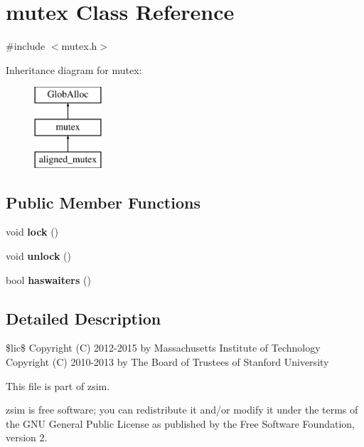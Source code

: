 \hypertarget{classmutex}{\section{mutex Class Reference}
\label{classmutex}
}


{\ttfamily \#include $<$mutex.\-h$>$}

Inheritance diagram for mutex\-:\begin{figure}[H]
\begin{center}
\leavevmode
\includegraphics[height=3.000000cm]{classmutex}
\end{center}
\end{figure}
\subsection*{Public Member Functions}
\begin{DoxyCompactItemize}
\item 
\hypertarget{classmutex_a760ba333c299e9b27730051c4c794f50}{void {\bfseries lock} ()}\label{classmutex_a760ba333c299e9b27730051c4c794f50}

\item 
\hypertarget{classmutex_a362d78bead80c2899d89444380cab1bd}{void {\bfseries unlock} ()}\label{classmutex_a362d78bead80c2899d89444380cab1bd}

\item 
\hypertarget{classmutex_a09140b0a6ad0f54e63056a3393c93a81}{bool {\bfseries haswaiters} ()}\label{classmutex_a09140b0a6ad0f54e63056a3393c93a81}

\end{DoxyCompactItemize}


\subsection{Detailed Description}
\$lic\$ Copyright (C) 2012-\/2015 by Massachusetts Institute of Technology Copyright (C) 2010-\/2013 by The Board of Trustees of Stanford University

This file is part of zsim.

zsim is free software; you can redistribute it and/or modify it under the terms of the G\-N\-U General Public License as published by the Free Software Foundation, version 2.

